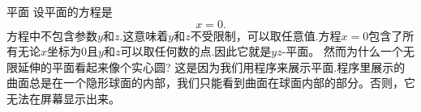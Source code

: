 ﻿\begin{surferPage}{平面}
设平面的方程是\[x=0.\]方程中不包含参数$y$和$z$.这意味着$y$和$z$不受限制，可以取任意值.方程$x=0$包含了所有无论$x$坐标为0且$y$和$z$可以取任何数的点.因此它就是$yz$-平面。
\newline \newline
然而为什么一个无限延伸的平面看起来像个实心圆? 这是因为我们用程序来展示平面.程序里展示的曲面总是在一个隐形球面的内部，我们只能看到曲面在球面内部的部分。否则，它无法在屏幕显示出来。
\end{surferPage}
